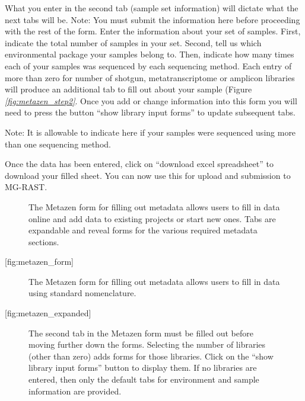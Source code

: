 \documentclass[letterpaper,10pt,english]{sphinxmanual}
\begin{document}
What you enter in the second tab (sample set information) will dictate
what the next tabs will be. Note: You must submit the information here
before proceeding with the rest of the form. Enter the information about
your set of samples. First, indicate the total number of samples in your
set. Second, tell us which environmental package your samples belong to.
Then, indicate how many times each of your samples was sequenced by each
sequencing method. Each entry of more than zero for number of shotgun,
metatranscriptome or amplicon libraries will produce an additional tab
to fill out about your sample (Figure
{\hyperref[\detokenize{user_manual:fig:metazen_step2}]{\emph{{[}fig:metazen\_step2{]}}}}. Once you add or change
information into this form you will need to press the button “show
library input forms” to update subsequent tabs.

Note: It is allowable to indicate here if your samples were sequenced
using more than one sequencing method.

Once the data has been entered, click on “download excel spreadsheet” to
download your filled sheet. You can now use this for upload and
submission to MG-RAST.

\begin{figure}[htbp]
\centering
\capstart

\noindent{}
\caption{The Metazen form for filling out metadata allows users to fill in
data online and add data to existing projects or start new ones. Tabs
are expandable and reveal forms for the various required metadata
sections.}\label{\detokenize{user_manual:id14}}\end{figure}

{[}fig:metazen\_form{]}

\begin{figure}[htbp]
\centering
\capstart

\noindent{}
\caption{The Metazen form for filling out metadata allows users to fill in
data using standard nomenclature.}\label{\detokenize{user_manual:id15}}\end{figure}

{[}fig:metazen\_expanded{]}

\begin{figure}[htbp]
\centering
\capstart

\noindent{}
\caption{The second tab in the Metazen form must be filled out before moving
further down the forms. Selecting the number of libraries (other than
zero) adds forms for those libraries. Click on the “show library
input forms” button to display them. If no libraries are entered,
then only the default tabs for environment and sample information are
provided.}\label{\detokenize{user_manual:id16}}\end{figure}
\end{document}
